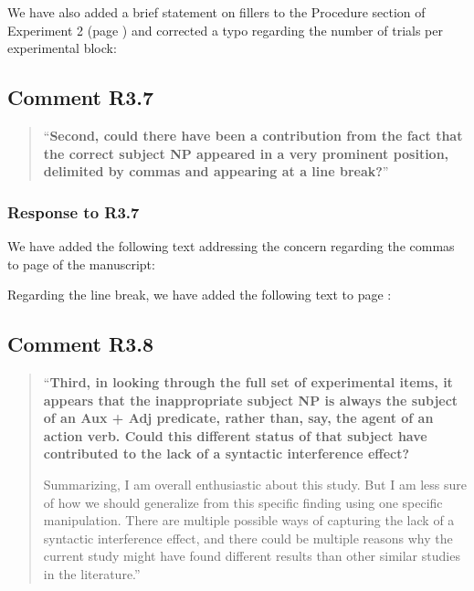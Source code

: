 \documentclass[12pt]{article}
\begin{document}
\noindent We have also added a brief statement on fillers to the Procedure section of Experiment 2 (page \pageref{fillers2}) and corrected a typo regarding the number of trials per experimental block:

\begin{quote}
\end{quote}

\subsection*{Comment R3.7}
\begin{quote}
``\textbf{Second, could there have been a contribution from the fact that the correct subject NP appeared in a very prominent position, delimited by commas and appearing at a line break?}''
\end{quote}

\subsubsection*{Response to R3.7}
We have added the following text addressing the concern regarding the commas to page \pageref{comma} of the manuscript:

\begin{quote}
\end{quote}

\noindent Regarding the line break, we have added the following text to page \pageref{linebreak}:

\begin{quote}
\end{quote}

\subsection*{Comment R3.8}
\begin{quote}
``\textbf{Third, in looking through the full set of experimental items, it appears that the inappropriate subject NP is always the subject of an Aux + Adj predicate, rather than, say, the agent of an action verb. Could this different status of that subject have contributed to the lack of a syntactic interference effect?}

Summarizing, I am overall enthusiastic about this study. But I am less sure of how we should generalize from this specific finding using one specific manipulation. There are multiple possible ways of capturing the lack of a syntactic interference effect, and there could be multiple reasons why the current study might have found different results than other similar studies in the literature.''
\end{quote}
\end{document}
